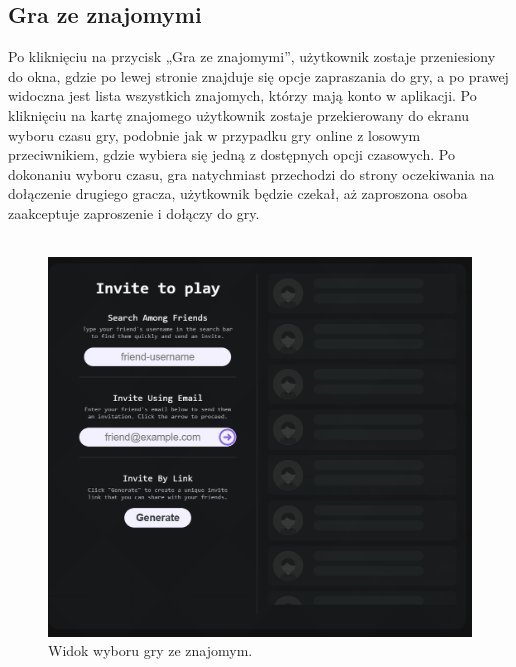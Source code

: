 \documentclass[12pt,a4paper]{article}
\begin{document}
\newpage
\subsection{Gra ze znajomymi}
Po kliknięciu na przycisk „Gra ze znajomymi”, użytkownik zostaje przeniesiony do okna, gdzie po lewej stronie znajduje się opcje zapraszania do gry, a po prawej widoczna jest lista wszystkich znajomych, którzy mają konto w aplikacji. Po kliknięciu na kartę znajomego użytkownik zostaje przekierowany do ekranu wyboru czasu gry, podobnie jak w przypadku gry online z losowym przeciwnikiem, gdzie wybiera się jedną z dostępnych opcji czasowych. Po dokonaniu wyboru czasu, gra natychmiast przechodzi do strony oczekiwania na dołączenie drugiego gracza, użytkownik będzie czekał, aż zaproszona osoba zaakceptuje zaproszenie i dołączy do gry.
\\\\


\begin{figure}[h!]
    \centering
    \includegraphics[width=1\textwidth]{zdj/ins_min_pvf.png}
    \caption{Widok wyboru gry ze znajomym.}
\end{figure}

\newpage
\end{document}
